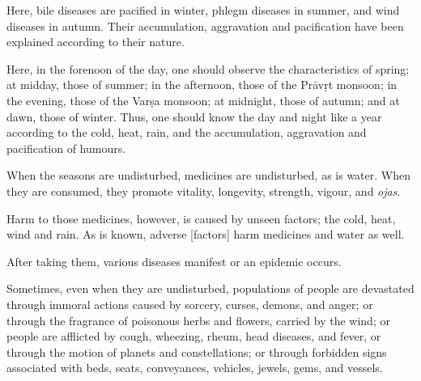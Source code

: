 \begin{translation}
\item [13]
Here, bile diseases are pacified in winter, phlegm diseases in summer, and wind diseases in autumn. 
Their accumulation, aggravation and pacification have been explained according to their nature. %

\item [14]
Here, %
in the forenoon of the day, %
one should observe %
the characteristics of spring; %
at midday, those of summer; in the afternoon, those of the Prāvṛt monsoon; %
in the evening, those of the Varṣa monsoon; 
at midnight, those of autumn; and at dawn, those of winter. %
Thus, one should know %
the day and night like a year %
according to the cold, heat, rain, and the accumulation, aggravation and pacification of humours. %

\item [15]
When the seasons are undisturbed, %
medicines are undisturbed, as is water. When they are consumed, they promote vitality, %
longevity, %
strength, %
vigour, %
and \emph{ojas}. %

\item [16]
Harm to those medicines, however, is caused by unseen factors; %
the cold, heat, wind and rain.
As is known, %
adverse [factors] %
harm medicines and water as well. 

\item [17]
After taking them, %
various diseases manifest or an epidemic occurs. %

\item [18]
Sometimes, %
even when they are undisturbed, %
populations of people %
are devastated %
through immoral actions caused by sorcery, %
curses, %
demons, %
and anger; %
or through the fragrance of poisonous herbs and flowers, %
carried by the wind; %
or people are afflicted by cough, %
wheezing, %
rheum, %
head diseases, %
and fever, 
or through the motion %
of planets and constellations; %
or through forbidden signs %
associated with beds, seats, conveyances, %
vehicles, %
jewels,
gems, %
and vessels. %


\end{translation}

